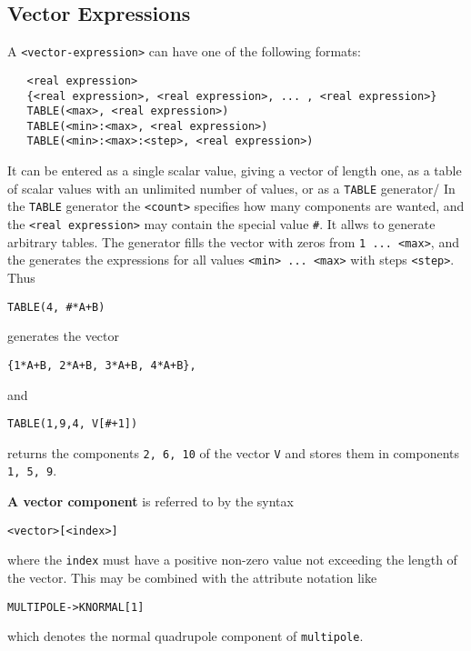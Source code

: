\documentclass{article}
\begin{document}
\subsection{Vector Expressions}
\label{sec:vect}
A \texttt{<vector-expression>} can have one of the following formats:
\begin{verbatim}
   <real expression>
   {<real expression>, <real expression>, ... , <real expression>}
   TABLE(<max>, <real expression>)
   TABLE(<min>:<max>, <real expression>)
   TABLE(<min>:<max>:<step>, <real expression>)
\end{verbatim}
It can be entered as a single scalar value,
giving a vector of length one,
as a table of scalar values with an unlimited number of values,
or as a \texttt{TABLE} generator/
In the \texttt{TABLE} generator the \texttt{<count>} specifies how
many components are wanted,
and the \texttt{<real expression>} may contain the special value
\texttt{\#}.
It allws to generate arbitrary tables.
The generator fills the vector with zeros from \verb'1 ... <max>',
and the generates the expressions for all values \verb'<min> ... <max>'
with steps \verb'<step>'.
Thus 
\begin{verbatim}
TABLE(4, #*A+B)
\end{verbatim} 
generates the vector 
\begin{verbatim}
{1*A+B, 2*A+B, 3*A+B, 4*A+B},
\end{verbatim}
and 
\begin{verbatim}
TABLE(1,9,4, V[#+1])
\end{verbatim} 
returns the components \verb'2, 6, 10' of the vector \texttt{V} and
stores them in components \verb'1, 5, 9'.

\textbf{A vector component} is referred to by the syntax
\begin{verbatim}
<vector>[<index>]
\end{verbatim}
where the \texttt{index} must have a positive non-zero value not
exceeding the length of the vector.
This may be combined with the attribute notation like
\begin{verbatim}
MULTIPOLE->KNORMAL[1]
\end{verbatim}
which denotes the normal quadrupole component of \texttt{multipole}.
\end{document}
